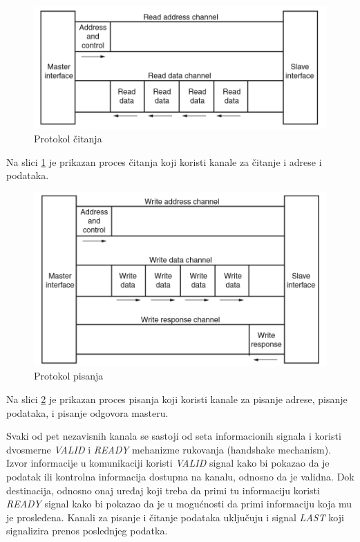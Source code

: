 \documentclass[a4paper, 12pt, diplomski]{etf}
\begin{document}
	\begin{figure}[htb]
		\centering
		\includegraphics[width=.7\textwidth]{images/axireadprotocol.png}
		\caption{Protokol čitanja}
		\label{fig:axiread}
	\end{figure}

	Na slici \ref{fig:axiread} je prikazan proces čitanja koji koristi kanale za čitanje i adrese i podataka.

	\begin{figure}[htb]
		\centering
		\includegraphics[width=.7\textwidth]{images/axiwriteprotocol.png}
		\caption{Protokol pisanja}
		\label{fig:axiwrite}
	\end{figure}

	Na slici \ref{fig:axiwrite} je prikazan proces pisanja koji koristi kanale za pisanje adrese, pisanje podataka, i pisanje odgovora masteru.

	Svaki od pet nezavisnih kanala se sastoji od seta informacionih signala i koristi dvosmerne \textit{VALID} i \textit{READY} mehanizme rukovanja (handshake mechanism). Izvor informacije u komunikaciji koristi \textit{VALID} signal kako bi pokazao da je podatak ili kontrolna informacija dostupna na kanalu, odnosno da je validna. Dok destinacija, odnosno onaj uređaj koji treba da primi tu informaciju koristi \textit{READY} signal kako bi pokazao da je u mogućnosti da primi informaciju koja mu je prosleđena. Kanali za pisanje i čitanje podataka uključuju i signal \textit{LAST} koji signalizira prenos poslednjeg podatka.
\end{document}
